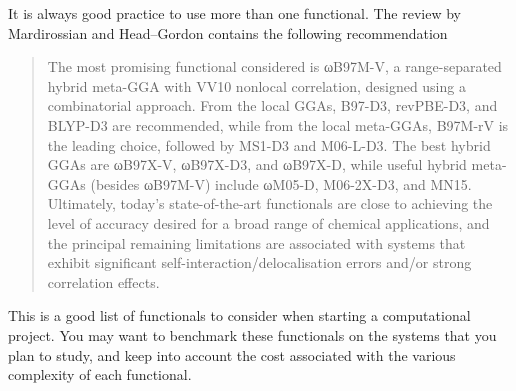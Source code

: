 \documentclass[../Main/notes.tex]{subfiles}
\begin{document}
It is always good practice to use more than one functional.
The review by Mardirossian and Head--Gordon contains the following recommendation
\begin{quote}
The most promising functional considered is ωB97M-V, a range-separated hybrid meta-GGA with VV10 nonlocal correlation, designed using a combinatorial approach. From the local GGAs, B97-D3, revPBE-D3, and BLYP-D3 are recommended, while from the local meta-GGAs, B97M-rV is the leading choice, followed by MS1-D3 and M06-L-D3. The best hybrid GGAs are ωB97X-V, ωB97X-D3, and ωB97X-D, while useful hybrid meta-GGAs (besides ωB97M-V) include ωM05-D, M06-2X-D3, and MN15. Ultimately, today's state-of-the-art functionals are close to achieving the level of accuracy desired for a broad range of chemical applications, and the principal remaining limitations are associated with systems that exhibit significant self-interaction/delocalisation errors and/or strong correlation effects.
\end{quote}

This is a good list of functionals to consider when starting a computational project.
You may want to benchmark these functionals on the systems that you plan to study, and keep into account the cost associated with the various complexity of each functional.
\end{document}
